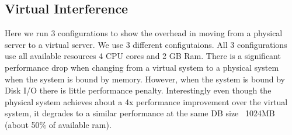 \subsection{Virtual Interference}
Here we run 3 configurations to show the overhead in moving from a physical server to a virtual server.   We use 3 different configutaions.  All 3 configurations use all available resources 4 CPU cores and 2 GB Ram.    There is a significant performance drop when changing from a virtual system to a physical system when the system is bound by memory.   However, when the system is bound by Disk I/O there is little performance penalty.    Interestingly even though the physical system achieves about a 4x performance improvement over the virtual system, it degrades to a similar performance at the same DB size ~1024MB (about 50\% of available ram).



